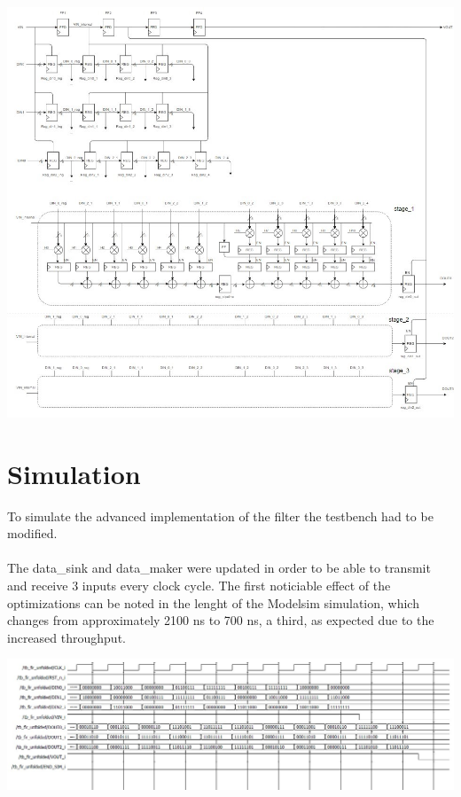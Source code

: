 \vspace{5mm}
\centerline{
\includegraphics[width=15.5cm]{./chapters/figures/fir_adv_2.jpg}}

\vspace{5mm}

\section{Simulation}

To simulate the advanced implementation of the filter the testbench had to be modified.
\paragraph{} 
The data\_sink and data\_maker were updated in order to be able to transmit and receive 3 inputs every clock cycle.
The first noticiable effect of the optimizations can be noted in the lenght of the Modelsim simulation, which changes from
approximately 2100 ns to 700 ns, a third, as expected due to the increased throughput.

\vspace{5mm}
\centerline{
\includegraphics[width=15.5cm]{./chapters/figures/waveform2.jpg}}

